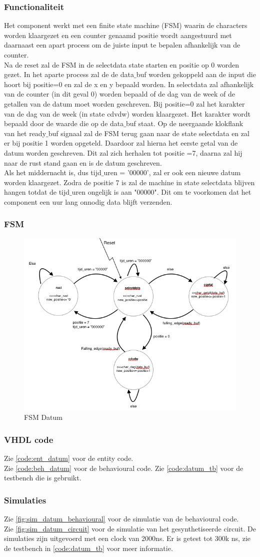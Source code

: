 \subsubsection{Functionaliteit}
Het component werkt met een finite state machine (FSM) waarin de characters worden klaargezet en een counter genaamd positie wordt aangestuurd met daarnaast een apart process om de juiste input te bepalen afhankelijk van de counter. \\
Na de reset zal de FSM in de selectdata state starten en positie op 0 worden gezet. 
In het aparte process zal de de data$\_$buf worden gekoppeld aan de input die hoort bij positie=0 en zal de x en y bepaald worden. 
 In selectdata zal  afhankelijk van de counter (in dit geval 0) worden bepaald of de dag van de week of de getallen van de datum moet worden geschreven. Bij positie=0 zal het karakter van de dag van de week (in state cdvdw) worden klaargezet. Het karakter wordt bepaald door de waarde die op de data$\_$buf staat. Op de neergaande klokflank van het ready$\_$buf signaal zal de FSM terug gaan naar de state selectdata en zal er bij positie 1 worden opgeteld. Daardoor zal hierna het eerste getal van de datum worden geschreven. Dit zal zich herhalen tot positie =7, daarna zal hij naar de rust stand gaan en is de datum geschreven. \\
 Als het middernacht is, dus tijd$\_$uren = '00000', zal er ook een nieuwe datum worden klaargezet. Zodra de positie 7 is zal de machine in state selectdata blijven hangen totdat de tijd$\_$uren ongelijk is aan "00000". Dit om te voorkomen dat het component een uur lang onnodig data blijft verzenden. 


\subsubsection{FSM}
\begin{figure}
  \centering
     \includegraphics[angle = 0, scale= 0.6]{verslag_schemas/datum_fsm.png}
       \caption{FSM Datum}
\label{fig:lcddatumfsm}
\end{figure}

\subsubsection{VHDL code}
Zie \ref{code:ent_datum} voor de entity code. \\
Zie \ref{code:beh_datum} voor de behavioural code.
Zie \ref{code:datum_tb} voor de testbench die is gebruikt.
\subsubsection{Simulaties}
Zie \ref{fig:sim_datum_behavioural} voor de simulatie van de behavioural code. \\
Zie \ref{fig:sim_datum_circuit} voor de simulatie van het gesynthetiseerde circuit. 
De simulaties zijn uitgevoerd met een clock van 2000ns.  Er is getest tot 300k ns, zie de testbench in \ref{code:datum_tb} voor meer informatie.

